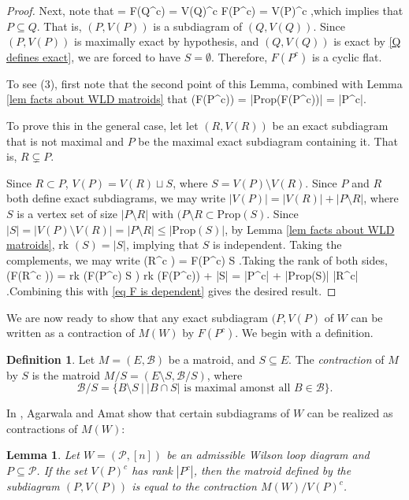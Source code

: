 \documentclass[11pt]{article}
\newcommand{\rk}{\textrm{rk }}
\def\bas #1\eas{\begin{align*} #1 \end{align*}}
\newcommand{\cP}{\mathcal{P}}
\newcommand{\cB}{\mathcal{B}}
\newcommand{\Prop}{\textrm{Prop}}
\newtheorem{lem}[thm]{Lemma}
\theoremstyle{remark}
\theoremstyle{definition}
\newtheorem{dfn}[thm]{Definition}
\begin{document}
\begin{proof}
Next, note that \bas C = F(Q^c) = V(Q)^c \subset F(P^c) = V(P)^c \;,\eas which implies that $P \subseteq Q$. That is, $(P, V(P))$ is a subdiagram of $(Q, V(Q))$. Since $(P, V(P))$ is maximally exact by hypothesis, and $(Q, V(Q))$ is exact by \eqref{Q defines exact}, we are forced to have $S = \emptyset$. Therefore, $F(P^c)$ is a cyclic flat.

To see (3), first note that the second point of this Lemma, combined with Lemma \ref{lem facts about WLD matroids} that
\bas\rk(F(P^c)) = |\Prop(F(P^c))| = |P^c|.\eas 

To prove this in the general case, let let $(R,V(R))$ be an exact subdiagram that is not maximal and $P$ be the maximal exact subdiagram containing it. That is, $R \subsetneq P$.

Since $R \subset P$, $V(P) = V(R) \sqcup S$, where $S = V(P) \setminus V(R)$. Since $P$ and $R$ both define exact subdiagrams, we may write $|V(P)| = |V(R)| + |P \setminus R|$, where $S$ is a vertex set of size $|P \setminus R|$ with $(P \setminus R \subset \Prop(S)$. Since  $|S| = |V(P) \setminus V(R)| = |P \setminus R| \leq |\Prop(S) |$, by Lemma \ref{lem facts about WLD matroids}, $\rk(S) = |S|$, implying that $S$ is independent. Taking the complements, we may write \bas F(R^c ) = F(P^c) \sqcup S \;.\eas Taking the rank of both sides, \bas \rk(F(R^c )) = \rk(F(P^c) \sqcup S ) \leq \rk(F(P^c)) + |S| = |P^c| + |\Prop(S)| \leq |R^c| \;.\eas Combining this with \eqref{eq F is dependent} gives the desired result.

\end{proof}

We are now ready to show that any exact subdiagram $(P, V(P)$ of $W$ can be written as a contraction of $M(W)$ by $F(P^c)$. We begin with a definition.

\begin{dfn}\label{matroid contraction}
Let $M = (E,\cB)$ be a matroid, and $S \subseteq E$. The {\em contraction} of $M$ by $S$ is the matroid $M/S = (E \setminus S, \cB / S)$, where
\[\cB / S = \{B \setminus S \ \big| \ |B\cap S | \text{ is maximal amonst all }B \in \cB\}.\]
\end{dfn}

In \cite{wilsonloop}, Agarwala and Amat show that certain subdiagrams of $W$ can be realized as contractions of $M(W)$:

\begin{lem} \label{contractsubdiaglem} \cite[Theorem 3.33]{wilsonloop} 
Let $W = (\cP, [n])$ be an admissible Wilson loop diagram and $P \subseteq \cP$. If the set $V(P)^c$ has rank $|P^c|$, then the matroid defined by the subdiagram $(P, V(P))$ is equal to the contraction $M(W)/V(P)^c$.
\end{lem}
\end{document}

